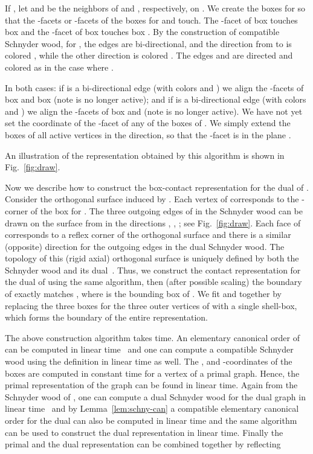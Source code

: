 \documentclass{article}
\begin{document}
If , let  and  be the neighbors of  and
, respectively, on .
We create the boxes for  so that
the -facets or -facets of the boxes for  and
 touch.
The -facet of box  touches box  and the -facet of
box  touches box .
By the construction of compatible Schnyder wood, for ,
the edges  are bi-directional, and the direction from 
to  is colored , while the other direction is colored . The edges
 and  are directed and colored as in the case where .

In both cases:
if  is a bi-directional edge (with colors  and )
we align the -facets of box  and box  (note
 is no longer active); and
if  is a bi-directional edge (with colors  and )
we align the -facets of box  and  (note 
is no longer active).
We have not yet set the coordinate of the -facet of any of the boxes of . We simply
extend the boxes of all active vertices in the  direction, so that the -facet is in
the plane .


An illustration of the representation obtained by this algorithm is shown in Fig.~\ref{fig:draw}.


Now we describe how to construct the box-contact representation for the dual of .
Consider the orthogonal surface induced by . Each vertex  of  corresponds
 to the -corner  of the box for . The three outgoing edges of  in the Schnyder
 wood can be drawn on the surface from  in the directions , , ; see Fig.~\ref{fig:draw}.
Each face of  corresponds to a reflex corner of the orthogonal surface and there is a similar
 (opposite) direction for the outgoing edges in the dual Schnyder wood. The topology of this
 (rigid axial) orthogonal surface is uniquely defined by both the Schnyder wood and its dual~\cite{FZ08}.
Thus, we construct the contact representation  for the dual of  using the same algorithm,
 then (after possible scaling) the boundary of  exactly matches , where 
 is the bounding box of .
We fit  and  together by replacing the three boxes for the three outer vertices of  with a single shell-box, which forms the boundary of the entire representation.



The above construction algorithm takes  time. An elementary canonical order of  can be
 computed in linear time~\cite{Kan96} and one can compute a compatible Schnyder wood using the
 definition in linear time as well.
The ,  and -coordinates of the boxes are computed in constant time for a vertex of a primal
 graph. Hence, the primal representation of the graph can be found in linear time.
Again from the Schnyder wood of , one can compute a dual Schnyder wood for the dual graph
 in linear time~\cite{FZ08} and by Lemma~\ref{lem:schny-can} a compatible elementary canonical order
 for the dual can also be computed in linear time and the same algorithm can be used to construct the
 dual representation in linear time.
 Finally the primal and the dual representation can be combined together by reflecting
\end{document}
